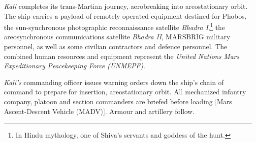 {\it Kali} completes its trans-Martian journey, aerobreaking into areostationary orbit. The ship carries a payload of remotely operated equipment destined for Phobos, the sun-synchronous photographic reconnaissance satellite {\it Bhadra I},\footnote{In Hindu mythology, one of Shiva's servants and goddess of the hunt.} the areosynchronous communications satellite {\it Bhadra II}, MARSBRIG military personnel, as well as some civilian contractors and defence personnel. The combined human resources and equipment represent the {\it United Nations Mars Expeditionary Peacekeeping Force (UNMEPF)}.
\StopTimelineDate

{\it Kali's} commanding officer issues warning orders down the ship's chain of command to prepare for insertion, areostationary orbit. All mechanized infantry company, platoon and section commanders are briefed before loading [Mars Ascent-Descent Vehicle (MADV)]. Armour and artillery follow.
\StopTimelineDate

